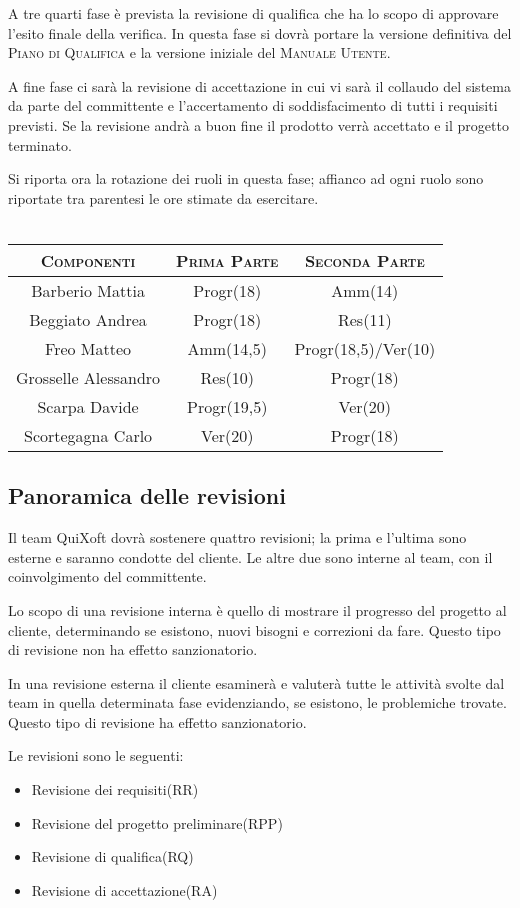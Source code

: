 \documentclass[11pt,a4paper]{article}
\begin{document}
A tre quarti fase è prevista la revisione di qualifica che ha lo scopo di approvare l'esito finale della verifica. In questa fase si dovrà portare la versione definitiva del \textsc{Piano di Qualifica} e la versione iniziale del \textsc{Manuale Utente}.

A fine fase ci sarà la revisione di accettazione in cui vi sarà il collaudo del sistema da parte del committente e l'accertamento di soddisfacimento di tutti i requisiti previsti. Se la revisione andrà a buon fine il prodotto verrà accettato e il progetto terminato.    

Si riporta ora la rotazione dei ruoli in questa fase; affianco ad ogni ruolo sono riportate tra parentesi le ore stimate da esercitare.\\\\
\begin{tabular}{|c|c|c|}
\hline
\textsc{Componenti} & \textsc{Prima Parte} & \textsc{Seconda Parte} \\ \hline \hline
Barberio Mattia & Progr(18) & Amm(14) \\ \hline
Beggiato Andrea & Progr(18) & Res(11) \\ \hline
Freo Matteo & Amm(14,5) & Progr(18,5)/Ver(10) \\ \hline
Grosselle Alessandro & Res(10) & Progr(18) \\ \hline
Scarpa Davide & Progr(19,5) & Ver(20) \\ \hline
Scortegagna Carlo & Ver(20) & Progr(18) \\ \hline
\end{tabular}
\subsection{Panoramica delle revisioni}
Il team QuiXoft dovrà sostenere quattro revisioni; la prima e l'ultima sono esterne e saranno condotte del cliente. Le altre due sono interne al team, con il coinvolgimento del committente.

Lo scopo di una revisione interna è quello di mostrare il progresso del progetto al cliente, determinando se esistono, nuovi bisogni e correzioni da fare. Questo tipo di revisione non ha effetto sanzionatorio.

In una revisione esterna il cliente esaminerà e valuterà tutte le attività svolte dal team in quella determinata fase evidenziando, se esistono, le problemiche trovate. Questo tipo di revisione ha effetto sanzionatorio. 

Le revisioni sono le seguenti:
\begin{itemize}
\item Revisione dei requisiti(RR)
\item Revisione del progetto preliminare(RPP)
\item Revisione di qualifica(RQ)
\item Revisione di accettazione(RA)
\end{itemize}
\end{document}
